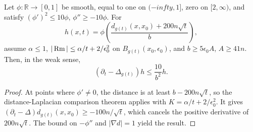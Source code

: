 \begin{lemma}
\label{lem:chow-iii-time-dependent-cutoff}
Let \(\phi\colon\mathbb R\to[0,1]\) be smooth, equal to one on
\((-infty,1]\), zero on \([2,\infty)\), and satisfy
\((\phi')^2\le10\phi\), \(\phi''\ge-10\phi\).  For
\[
 h(x,t)=\phi\!\left(\frac{d_{g(t)}(x,x_0)+200n\sqrt t}{b}\right),
\]
assume \(\alpha\le1\), \(|\operatorname{Rm}|\le\alpha/t+2/\epsilon_0^2\) on
\(B_{g(t)}(x_0,\epsilon_0)\), and \(b\ge5\epsilon_0A\), \(A\ge41n\).  Then,
in the weak sense,
\[
 (\partial_t-\Delta_{g(t)})h\le\frac{10}{b^2}h.
\]
\end{lemma}
\begin{proof}
At points where \(\phi'\ne0\), the distance is at least \(b-200n\sqrt t\),
so the distance-Laplacian comparison theorem applies with
\(K=\alpha/t+2/\epsilon_0^2\).  It gives
\((\partial_t-\Delta)d_{g(t)}(x,x_0)\ge-100n/\sqrt t\), which cancels the
positive derivative of \(200n\sqrt t\).  The bound on \(-\phi''\) and
\(|\nabla d|=1\) yield the result.
\end{proof}

